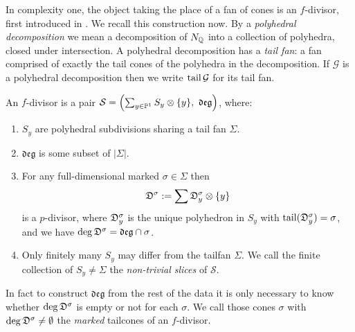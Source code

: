 In complexity one, the object taking the place of a fan of cones is an \(f\)-divisor, first introduced in \cite{ilten2009polarized}. We recall this construction now. By a \textit{polyhedral decomposition} we mean a decomposition of \(N_{\mathbb{Q}}\) into a collection of polyhedra, closed under intersection. A polyhedral decomposition has a \textit{tail fan}: a fan comprised of exactly the tail cones of the polyhedra in the decomposition. If \(\mathcal{G}\) is a polyhedral decomposition then we write \(\operatorname{tail} \mathcal{G}\) for its tail fan.
\begin{definition}
An \(f\)-divisor is a pair \( \mathcal{S} = \left( \sum_{y \in \mathbb{P}^1} S_y \otimes \{y\}, \ \mathfrak{deg} \right)\), where:
\begin{enumerate}
\item \(S_y\) are polyhedral subdivisions sharing a tail fan \(\Sigma\).
\item \(\mathfrak{deg}\) is some subset of \(|\Sigma|\).
\item For any full-dimensional marked \(\sigma \in \Sigma\) then
\[
{\mathfrak{D}}^\sigma := \sum {\mathfrak{D}}_y^\sigma \otimes \{y\}
\]
is a \(p\)-divisor, where \({\mathfrak{D}}_y^\sigma\) is the unique polyhedron in \(S_y\) with \(\operatorname{tail}({\mathfrak{D}}_y^\sigma) = \sigma\), and we have \(\deg {\mathfrak{D}}^\sigma = \mathfrak{deg} \cap \sigma\).
\item Only finitely many \(S_y\) may differ from the tailfan \(\Sigma\). We call the finite collection of \(S_y \neq \Sigma\) the \textit{non-trivial slices} of \(\mathcal{S}\).
\end{enumerate}
\end{definition}
In fact to construct \(\mathfrak{deg}\) from the rest of the data it is only necessary to know whether \(\deg {\mathfrak{D}}^\sigma\) is empty or not for each \(\sigma\). We call those cones \(\sigma\) with \(\deg {\mathfrak{D}}^\sigma \neq \emptyset\) the \textit{marked} tailcones of an \(f\)-divisor.
